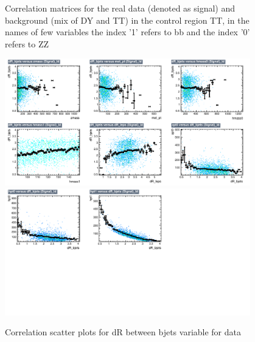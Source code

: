 \begin{figure}[!htb]
\caption{ Correlation matrices for the real data (denoted as signal) and background (mix of DY and TT) in the control region TT, in the names of few variables the index '1' refers to bb and the index '0' refers to ZZ}
\label{fig:corrMatrix_CRTT}                                                       
\end{figure}





\begin{figure}[!htb]%
\centering
\includegraphics[width=0.95\textwidth]{figures/CRTT/dataset/plots/correlationscatter_dR_bjets__Id_c1.pdf}
\includegraphics[width=0.95\textwidth]{figures/CRTT/dataset/plots/correlationscatter_dR_bjets__Id_c2.pdf}
\caption{ Correlation scatter plots for dR between bjets variable for data}%
\label{fig:correlations_CRTT_drbjets_S}                                                       
\end{figure}



